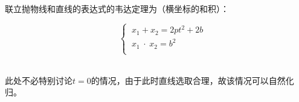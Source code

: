 \documentclass[UTF8]{ctexart}
\begin{document}
    联立抛物线和直线的表达式的韦达定理为（横坐标的和积）：\vspace{3pt}
    \begin{large}
        \begin{equation*}
            ~~~~~~\begin{cases}
                ~x_1+x_2=2pt^2+2b\\[1mm]
                ~x_1\hspace{3pt}\cdot\hspace{3pt}x_2=b^2\\[1mm]
            \end{cases}
        \end{equation*}
    \end{large}\\[1mm]
    此处不必特别讨论$t=0$的情况，由于此时直线选取合理，故该情况可以自然化归。

\newpage
\end{document}
